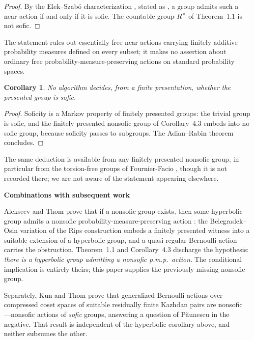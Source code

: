 \documentclass[10pt]{article}
\newtheorem{corollary}[theorem]{Corollary}
\newcommand{\subhead}[1]{\par\medskip\noindent\textbf{#1}\par\smallskip}
\begin{document}
\begin{proof}
By the Elek--Szab\'o characterization \cite{ES05}, stated as \cite[Theorem~5.2]{Pes08}, a group admits such a near action if and only if it is sofic. The countable group $R^\times$ of Theorem~1.1 is not sofic.
\end{proof}

The statement rules out essentially free near actions carrying finitely additive probability measures defined on every subset; it makes no assertion about ordinary free probability-measure-preserving actions on standard probability spaces.

\begin{corollary}
No algorithm decides, from a finite presentation, whether the presented group is sofic.
\end{corollary}

\begin{proof}
Soficity is a Markov property of finitely presented groups: the trivial group is sofic, and the finitely presented nonsofic group of Corollary~4.3 embeds into no sofic group, because soficity passes to subgroups. The Adian--Rabin theorem \cite{Adi55,Rab58} concludes.
\end{proof}

The same deduction is available from any finitely presented nonsofic group, in particular from the torsion-free groups of Fournier-Facio \cite{FF26}, though it is not recorded there; we are not aware of the statement appearing elsewhere.

\subhead{Combinations with subsequent work}
Alekseev and Thom prove that if a nonsofic group exists, then some hyperbolic group admits a nonsofic probability-measure-preserving action \cite[Corollary~E]{AT25}: the Belegradek--Osin variation of the Rips construction embeds a finitely presented witness into a suitable extension of a hyperbolic group, and a quasi-regular Bernoulli action carries the obstruction. Theorem~1.1 and Corollary~4.3 discharge the hypothesis: \emph{there is a hyperbolic group admitting a nonsofic p.m.p.\ action}. The conditional implication is entirely theirs; this paper supplies the previously missing nonsofic group.

Separately, Kun and Thom prove that generalized Bernoulli actions over compressed coset spaces of suitable residually finite Kazhdan pairs are nonsofic \cite{KuT26}---nonsofic actions of \emph{sofic} groups, answering a question of P\u{a}unescu in the negative. That result is independent of the hyperbolic corollary above, and neither subsumes the other.
\end{document}
